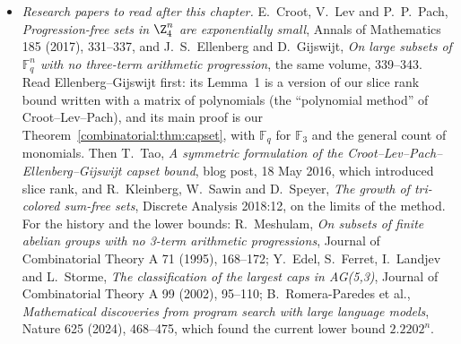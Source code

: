 \begin{itemize}
\item \emph{Research papers to read after this chapter.} E.~Croot, V.~Lev and P.~P.~Pach, \emph{Progression-free sets in $\Z_4^n$ are exponentially small}, Annals of Mathematics 185 (2017), 331--337, and J.~S.~Ellenberg
and D.~Gijswijt, \emph{On large subsets of $\mathbb F_q^n$ with no three-term arithmetic progression}, the same volume, 339--343. Read Ellenberg--Gijswijt first: its Lemma~1 is a version of our slice rank bound
written with a matrix of polynomials (the ``polynomial method'' of Croot--Lev--Pach), and its main proof is our Theorem~\ref{combinatorial:thm:capset}, with $\mathbb F_q$ for $\mathbb F_3$ and the general count of monomials. Then
T.~Tao, \emph{A symmetric formulation of the Croot--Lev--Pach--Ellenberg--Gijswijt capset bound}, blog post, 18 May 2016, which introduced slice rank, and R.~Kleinberg, W.~Sawin and D.~Speyer, \emph{The growth of
tri-colored sum-free sets}, Discrete Analysis 2018:12, on the limits of the method. For the history and the lower bounds: R.~Meshulam, \emph{On subsets of finite abelian groups with no 3-term arithmetic
progressions}, Journal of Combinatorial Theory A 71 (1995), 168--172; Y.~Edel, S.~Ferret, I.~Landjev and L.~Storme, \emph{The classification of the largest caps in AG(5,3)}, Journal of Combinatorial Theory A 99
(2002), 95--110; B.~Romera-Paredes et al., \emph{Mathematical discoveries from program search with large language models}, Nature 625 (2024), 468--475, which found the current lower bound $2.2202^n$.
\end{itemize}
